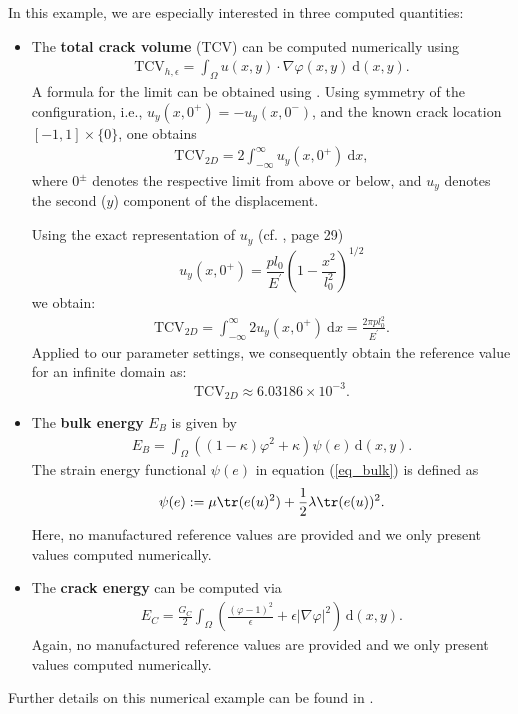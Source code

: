 In this example, we are especially interested in three computed quantities:
\begin{itemize}
 \item The \textbf{total crack volume} (TCV) can be computed numerically using
\begin{align}
\label{eq_TCV_num}
\text{TCV}_{h,\epsilon}=\int_{\Omega} u(x,y) \cdot \nabla \varphi(x,y)\ \mathrm{d}{(x,y)}.
\end{align}
A formula for the limit can be obtained using \cite{sneddon1969crack}.
Using symmetry of the configuration, i.e., $u_y(x,0^+) = - u_y(x,0^-)$,
and the known crack location $[-1,1]\times \{0\}$, one obtains
\begin{align*}
\text{TCV}_{2D}=2 \int_{-\infty}^{\infty} u_y (x,0^+)\ \mathrm{d}x,
\end{align*}
where $0^\pm$ denotes the respective limit from above or below, and
$u_y$ denotes the second ($y$) component of the displacement.

Using the exact representation of $u_y$ (cf. \cite{sneddon1969crack}, page
29)
\[
u_y(x,0^+) =  \frac{p l_0}{E^{\prime}} \left(1-\frac{x^2}{l_0^2}\right)^{1/2}
\]
we obtain:
\begin{align}
\label{eq_TCV_exact}
 \text{TCV}_{2D}  
= \int_{-\infty}^{\infty} 2 u_y (x,0^+)\ \mathrm{d}x 
= \frac{2\pi p l_0^2}{E^{\prime}}.
\end{align}
Applied to our parameter settings, we consequently
obtain the reference value for an infinite domain as:
\[
\text{TCV}_{2D} \approx 6.03186\times 10^{-3}.
\]

\item The \textbf{bulk energy} $E_B$ is given by
\begin{align}
\label{eq_bulk}
E_B= \int_{\Omega} ((1-\kappa)\varphi^2 + \kappa) \psi(e)\, \mathrm{d}{(x,y)}.
\end{align}
The strain energy functional $\psi(e)$ in equation (\ref{eq_bulk}) is defined as
\begin{align*}
 \psi(e):= \mu \tr (e(u)^2) + \frac{1}{2} \lambda \tr (e(u))^2.
\end{align*}
Here, no manufactured reference values are provided and we only present
values computed numerically.
\item The \textbf{crack energy} can be computed via
\begin{align}
\label{eq_crack}
 E_C = \frac{G_C}{2} \int_{\Omega} \left( \frac{(\varphi-1)^2}{\epsilon} +  \epsilon |\nabla \varphi|^2\right) \, \mathrm{d}{(x,y)}.
\end{align}
Again, no manufactured reference values are provided and we only present
values computed numerically.
\end{itemize}

Further details on this numerical example can be found in \cite[Chapter 7]{schroder2020selection}.


%




